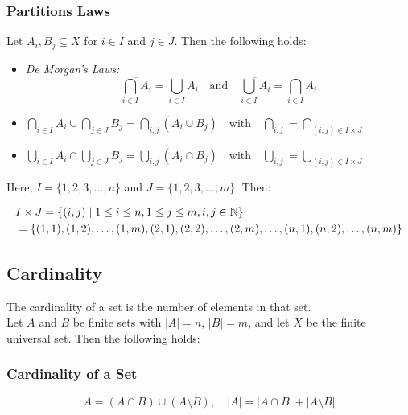 \subsubsection{Partitions Laws}

Let \( A_i, B_j \subseteq X \) for \( i \in I \) and \( j \in J \). Then the following holds:

\begin{itemize}


	\item\emph{De Morgan's Laws:}
	\[
		\overline{\bigcap_{i \in I} A_i}= \bigcup_{i \in I} \overline{A_i} \quad \text{and} \quad \overline{\bigcup_{i \in I} A_i} = \bigcap_{i \in I} \overline{A_i}
	\]

	\item\(
		\bigcap_{i \in I} A_i \cup \bigcap_{j \in J} B_j = \bigcap_{i,j} (A_i \cup B_j) \quad \text{with} \quad \bigcap_{i,j} = \bigcap_{(i,j) \in I \times J}
	\)


	\item\(
		\bigcup_{i \in I} A_i \cap \bigcup_{j \in J} B_j = \bigcup_{i,j} (A_i \cap B_j) \quad \text{with} \quad \bigcup_{i,j} = \bigcup_{(i,j) \in I \times J}
	\)

\end{itemize}

Here, \( I = \{ 1, 2, 3, \dots, n \} \) and \( J = \{ 1, 2, 3, \dots, m \} \). Then:

\begin{align*}
&I \times J = \{ (i, j) \mid 1 \leq i \leq n, 1 \leq j \leq m, i, j \in \mathbb{N} \} \\
&= \{ (1, 1), (1, 2), \dots, (1, m), (2, 1), (2, 2), \dots, (2, m), \dots, (n, 1), (n, 2), \dots, (n, m) \}
\end{align*}

\subsection{Cardinality}

The cardinality of a set is the number of elements in that set.
\\
Let \( A \) and \( B \) be finite sets with \( |A| = n \), \( |B| = m \), and let \( X \) be the finite universal set. Then the following holds:

\subsubsection{Cardinality of a Set}
\[
	A = (A \cap B) \cup (A \setminus B), \quad |A| = |A \cap B| + |A \setminus B|
\]

